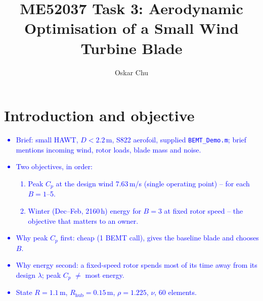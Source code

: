 \documentclass[11pt,a4paper]{article}
\title{\vspace{-1.2cm}ME52037 Task 3: Aerodynamic Optimisation of a Small Wind Turbine Blade}
\author{Oskar Chu}
\date{}
\newcommand{\note}[1]{\textcolor{blue}{#1}}
\begin{document}
\maketitle
\vspace{-1cm}

\section{Introduction and objective}  %
\note{
\begin{itemize}
  \item Brief: small HAWT, $D < 2.2$\,m, S822 aerofoil, supplied \texttt{BEMT\_Demo.m}; brief mentions incoming wind, rotor loads, blade mass and noise.
  \item Two objectives, in order:
  \begin{enumerate}
    \item Peak $C_p$ at the design wind 7.63\,m/s (single operating point) -- for each $B = 1$--5.
    \item Winter (Dec--Feb, 2160\,h) energy for $B = 3$ at fixed rotor speed -- the objective that matters to an owner.
  \end{enumerate}
  \item Why peak $C_p$ first: cheap (1 BEMT call), gives the baseline blade and chooses $B$.
  \item Why energy second: a fixed-speed rotor spends most of its time away from its design $\lambda$; peak $C_p$ $\neq$ most energy.
  \item State $R = 1.1$\,m, $R_\text{hub} = 0.15$\,m, $\rho = 1.225$, $\nu$, 60 elements.
\end{itemize}
}

\end{document}

